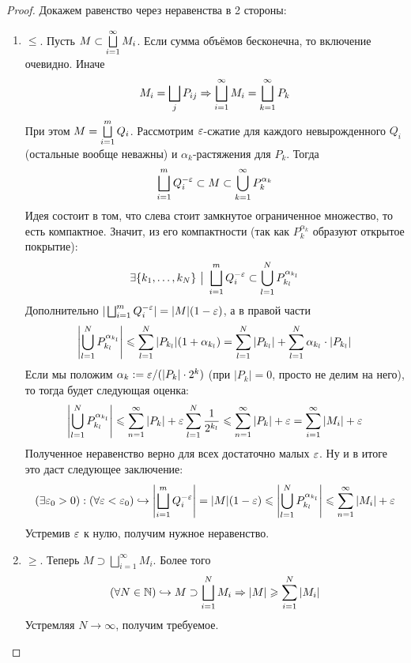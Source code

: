 \begin{proof}
	Докажем равенство через неравенства в 2 стороны:
	\begin{enumerate}
		\item $\le$. Пусть $M \subset \bigsqcup\limits_{i = 1}^\infty M_i$. Если сумма объёмов бесконечна, то включение очевидно. Иначе
		\[
			M_i = \bigsqcup\limits_j P_{ij} \Rightarrow \bigsqcup\limits_{i = 1}^\infty M_i = \bigsqcup\limits_{k = 1}^\infty P_k
		\]
		При этом $M = \bigsqcup\limits_{i = 1}^m Q_i$. Рассмотрим $\varepsilon$-сжатие для каждого невырожденного $Q_i$ (остальные вообще неважны) и $\alpha_k$-растяжения для $P_k$. Тогда
		\[
			\bigsqcup\limits_{i = 1}^m Q_i^{-\varepsilon} \subset M \subset \bigcup\limits_{k = 1}^\infty P_k^{\alpha_k}
		\]
		Идея состоит в том, что слева стоит замкнутое ограниченное множество, то есть компактное. Значит, из его компактности (так как $P_k^{\alpha_k}$ образуют открытое покрытие):
		\[
			\exists \{k_1, \ldots, k_N\} \ \big|\  \bigsqcup\limits_{i = 1}^m Q_i^{-\varepsilon} \subset \bigcup\limits_{l = 1}^N P_{k_l}^{\alpha_{k_l}}
		\]
		Дополнительно $|\bigsqcup_{i = 1}^m Q_i^{-\varepsilon}| = |M|(1 - \varepsilon)$, а в правой части
		\[
			\left|\bigcup_{l = 1}^N P_{k_l}^{\alpha_{k_l}}\right| \leqslant \sum_{l = 1}^N |P_{k_l}|(1 + \alpha_{k_l}) = \sum\limits_{l = 1}^N |P_{k_l}| + \sum\limits_{l = 1}^N \alpha_{k_l} \cdot |P_{k_l}|
		\]
		Если мы положим $\alpha_k := \varepsilon / (|P_k| \cdot 2^k)$ (при $|P_k| = 0$, просто не делим на него), то тогда будет следующая оценка:
		\[
			\left|\bigcup_{l = 1}^N P_{k_l}^{\alpha_{k_l}}\right| \leqslant \sum_{n = 1}^\infty |P_k| + \varepsilon \sum\limits_{l=1}^N \frac{1}{2^{k_l}} \leqslant \sum_{n = 1}^\infty |P_k| + \varepsilon = \sum\limits_{i = 1}^\infty |M_i| + \varepsilon
		\]
		Полученное неравенство верно для всех достаточно малых $\varepsilon$. Ну и в итоге это даст следующее заключение:
		\[
			(\exists \varepsilon_0 > 0) : (\forall \varepsilon < \varepsilon_0) \hookrightarrow \left|\bigsqcup\limits_{i = 1}^m Q_i^{-\varepsilon}\right| = |M|(1 - \varepsilon) \leqslant \left|\bigcup_{l = 1}^N P_{k_l}^{\alpha_{k_l}}\right| \leqslant \sum_{n = 1}^\infty |M_i| + \varepsilon
		\]
		Устремив $\varepsilon$ к нулю, получим нужное неравенство.
		
		\item $\ge$. Теперь $M \supset \bigsqcup_{i = 1}^\infty M_i$. Более того
		\[
			(\forall N \in \mathbb{N}) \hookrightarrow M \supset \bigsqcup_{i = 1}^N M_i \Rightarrow |M| \geqslant \sum\limits_{i = 1}^N |M_i|
		\]
		Устремляя $N \to \infty$, получим требуемое.
	\end{enumerate}
\end{proof}